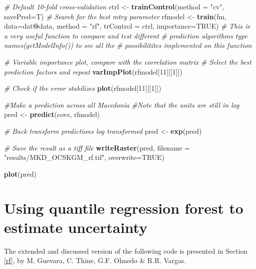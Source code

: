 \documentclass[10pt,b5paper,]{book}
\newenvironment{Shaded}{\begin{snugshade}}{\end{snugshade}}
\newcommand{\CommentTok}[1]{\textcolor[rgb]{0.56,0.35,0.01}{\textit{#1}}}
\newcommand{\DataTypeTok}[1]{\textcolor[rgb]{0.13,0.29,0.53}{#1}}
\newcommand{\DecValTok}[1]{\textcolor[rgb]{0.00,0.00,0.81}{#1}}
\newcommand{\KeywordTok}[1]{\textcolor[rgb]{0.13,0.29,0.53}{\textbf{#1}}}
\newcommand{\NormalTok}[1]{#1}
\newcommand{\OperatorTok}[1]{\textcolor[rgb]{0.81,0.36,0.00}{\textbf{#1}}}
\newcommand{\OtherTok}[1]{\textcolor[rgb]{0.56,0.35,0.01}{#1}}
\newcommand{\StringTok}[1]{\textcolor[rgb]{0.31,0.60,0.02}{#1}}
\theoremstyle{definition}
\theoremstyle{definition}
\theoremstyle{definition}
\theoremstyle{remark}
\begin{document}
\begin{Shaded}
\begin{Highlighting}[]
\CommentTok{# Default 10-fold cross-validation}
\NormalTok{ctrl <-}\StringTok{ }\KeywordTok{trainControl}\NormalTok{(}\DataTypeTok{method =} \StringTok{"cv"}\NormalTok{, }\DataTypeTok{savePred=}\NormalTok{T)}
\CommentTok{# Search for the best mtry parameter}
\NormalTok{rfmodel <-}\StringTok{ }\KeywordTok{train}\NormalTok{(fm, }\DataTypeTok{data=}\NormalTok{dat}\OperatorTok{@}\NormalTok{data, }\DataTypeTok{method =} \StringTok{"rf"}\NormalTok{, }\DataTypeTok{trControl =}\NormalTok{ ctrl,}
                 \DataTypeTok{importance=}\OtherTok{TRUE}\NormalTok{)}
\CommentTok{# This is a very useful function to compare and test different}
\CommentTok{# prediction algorithms type names(getModelInfo()) to see all the}
\CommentTok{# possibilitites implemented on this function}


\CommentTok{# Variable importance plot, compare with the correlation matrix}
\CommentTok{# Select the best prediction factors and repeat}
\KeywordTok{varImpPlot}\NormalTok{(rfmodel[}\DecValTok{11}\NormalTok{][[}\DecValTok{1}\NormalTok{]])}

\CommentTok{# Check if the error stabilizes}
\KeywordTok{plot}\NormalTok{(rfmodel[}\DecValTok{11}\NormalTok{][[}\DecValTok{1}\NormalTok{]])}

\CommentTok{#Make a prediction across all Macedonia}
\CommentTok{#Note that the units are still in log}
\NormalTok{pred <-}\StringTok{ }\KeywordTok{predict}\NormalTok{(covs, rfmodel)}

\CommentTok{# Back transform predictions log transformed}
\NormalTok{pred <-}\StringTok{ }\KeywordTok{exp}\NormalTok{(pred)}

\CommentTok{# Save the result as a tiff file}
\KeywordTok{writeRaster}\NormalTok{(pred, }\DataTypeTok{filename =} \StringTok{"results/MKD_OCSKGM_rf.tif"}\NormalTok{,}
            \DataTypeTok{overwrite=}\OtherTok{TRUE}\NormalTok{)}


\KeywordTok{plot}\NormalTok{(pred)}
\end{Highlighting}
\end{Shaded}

\clearpage

\hypertarget{cd:quantreg}{%
\section{Using quantile regression forest to estimate
uncertainty}\label{cd:quantreg}}

The extended and discussed version of the following code is presented in
Section \ref{rf}, by M. Guevara, C. Thine, G.F. Olmedo \& R.R. Vargas.
\end{document}
